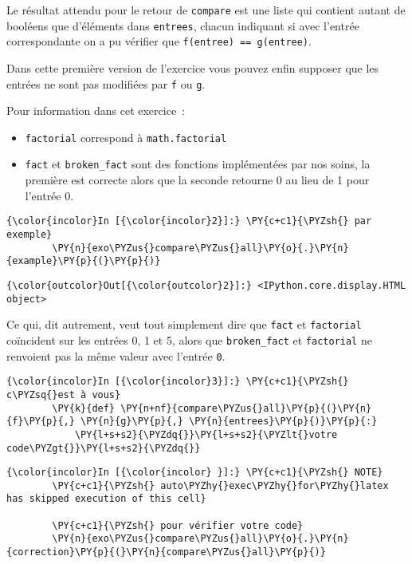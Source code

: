 Le résultat attendu pour le retour de \texttt{compare} est une liste qui
contient autant de booléens que d'éléments dans \texttt{entrees}, chacun
indiquant si avec l'entrée correspondante on a pu vérifier que
\texttt{f(entree)\ ==\ g(entree)}.

Dans cette première version de l'exercice vous pouvez enfin supposer que
les entrées ne sont pas modifiées par \texttt{f} ou \texttt{g}.

    Pour information dans cet exercice~:

\begin{itemize}
\tightlist
\item
  \texttt{factorial} correspond à \texttt{math.factorial}
\item
  \texttt{fact} et \texttt{broken\_fact} sont des fonctions implémentées
  par nos soins, la première est correcte alors que la seconde retourne
  0 au lieu de 1 pour l'entrée 0.
\end{itemize}

    \begin{Verbatim}[commandchars=\\\{\}]
{\color{incolor}In [{\color{incolor}2}]:} \PY{c+c1}{\PYZsh{} par exemple}
        \PY{n}{exo\PYZus{}compare\PYZus{}all}\PY{o}{.}\PY{n}{example}\PY{p}{(}\PY{p}{)}
\end{Verbatim}


\begin{Verbatim}[commandchars=\\\{\}]
{\color{outcolor}Out[{\color{outcolor}2}]:} <IPython.core.display.HTML object>
\end{Verbatim}
            
    Ce qui, dit autrement, veut tout simplement dire que \texttt{fact} et
\texttt{factorial} coïncident sur les entrées 0, 1 et 5, alors que
\texttt{broken\_fact} et \texttt{factorial} ne renvoient pas la même
valeur avec l'entrée \texttt{0}.

    \begin{Verbatim}[commandchars=\\\{\}]
{\color{incolor}In [{\color{incolor}3}]:} \PY{c+c1}{\PYZsh{} c\PYZsq{}est à vous}
        \PY{k}{def} \PY{n+nf}{compare\PYZus{}all}\PY{p}{(}\PY{n}{f}\PY{p}{,} \PY{n}{g}\PY{p}{,} \PY{n}{entrees}\PY{p}{)}\PY{p}{:}
            \PY{l+s+s2}{\PYZdq{}}\PY{l+s+s2}{\PYZlt{}votre code\PYZgt{}}\PY{l+s+s2}{\PYZdq{}}
\end{Verbatim}


    \begin{Verbatim}[commandchars=\\\{\}]
{\color{incolor}In [{\color{incolor} }]:} \PY{c+c1}{\PYZsh{} NOTE}
        \PY{c+c1}{\PYZsh{} auto\PYZhy{}exec\PYZhy{}for\PYZhy{}latex has skipped execution of this cell}
        
        \PY{c+c1}{\PYZsh{} pour vérifier votre code}
        \PY{n}{exo\PYZus{}compare\PYZus{}all}\PY{o}{.}\PY{n}{correction}\PY{p}{(}\PY{n}{compare\PYZus{}all}\PY{p}{)}
\end{Verbatim}


